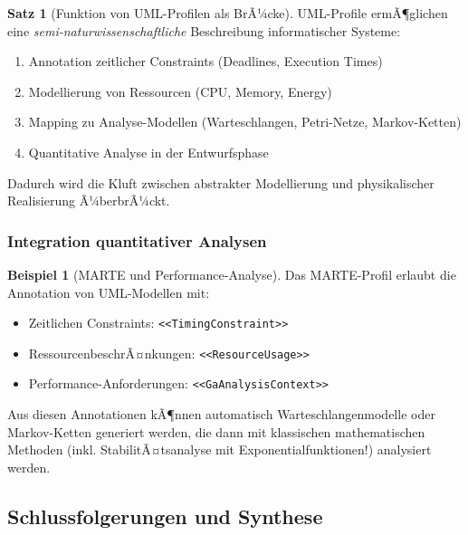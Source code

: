 ﻿\documentclass[a4paper,12pt]{scrreprt}
\theoremstyle{definition}
\newtheorem{beispiel}{Beispiel}[section]
\newtheorem{satz}{Satz}[section]
\begin{document}
\begin{satz}[Funktion von UML-Profilen als BrÃ¼cke]
	UML-Profile ermÃ¶glichen eine \textit{semi-naturwissenschaftliche} Beschreibung informatischer Systeme:
	\begin{enumerate}
		\item[-] Annotation zeitlicher Constraints (Deadlines, Execution Times)
		\item[-] Modellierung von Ressourcen (CPU, Memory, Energy)
		\item[-] Mapping zu Analyse-Modellen (Warteschlangen, Petri-Netze, Markov-Ketten)
		\item[-] Quantitative Analyse in der Entwurfsphase
	\end{enumerate}
	
	Dadurch wird die Kluft zwischen abstrakter Modellierung und physikalischer Realisierung Ã¼berbrÃ¼ckt.
\end{satz}

\subsubsection{Integration quantitativer Analysen}

\begin{beispiel}[MARTE und Performance-Analyse]
	Das MARTE-Profil erlaubt die Annotation von UML-Modellen mit:
	\begin{itemize}
		\item[-] Zeitlichen Constraints: \texttt{<<TimingConstraint>>}
		\item[-] RessourcenbeschrÃ¤nkungen: \texttt{<<ResourceUsage>>}
		\item[-] Performance-Anforderungen: \texttt{<<GaAnalysisContext>>}
	\end{itemize}
	
	Aus diesen Annotationen kÃ¶nnen automatisch Warteschlangenmodelle oder Markov-Ketten generiert werden, die dann mit klassischen mathematischen Methoden (inkl. StabilitÃ¤tsanalyse mit Exponentialfunktionen!) analysiert werden.
\end{beispiel}

\subsection{Schlussfolgerungen und Synthese}
\end{document}
